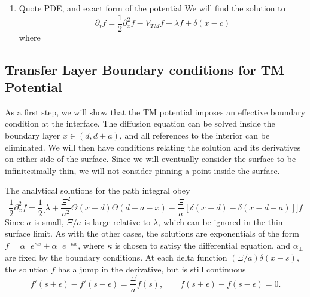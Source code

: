 \begin{enumerate}

  \item Quote PDE, and exact form of the potential
    We will find the solution to 
    \begin{equation}
      \partial_t f = \frac{1}{2}\partial_x^2f -V_{TM} f - \lambda f + \delta(x-c)
    \end{equation}
    where 
\end{enumerate}

\subsection{Transfer Layer Boundary conditions for TM Potential}

As a first step, we will show that the TM potential imposes an effective boundary condition at the interface. 
The diffusion equation can be solved inside the boundary layer $x\in(d,d+a)$, and all references 
to the interior can be eliminated.  We will then have conditions relating the solution and its derivatives
on either side of the surface.  Since we will eventually consider the surface to be infinitesimally thin,
we will not consider pinning a point inside the surface.  

The analytical solutions for the path integral obey
\begin{equation}
  \frac{1}{2}\partial_x^2f =\frac{1}{2}\bigg[\lambda+\frac{\Xi^2}{a^2}\Theta(x-d)\Theta(d+a-x)
  - \frac{\Xi}{a}[\delta(x-d)-\delta(x-d-a)]\bigg]f
\end{equation}
Since $a$ is small, $\Xi/a$ is large relative to $\lambda$, which can be ignored in the thin-surface limit.    
As with the other cases, the solutions are exponentials of the form $f = \alpha_+ e^{\kappa x}+\alpha_- e^{-\kappa x}$, 
where $\kappa$ is chosen to satisy the differential equation, and $\alpha_\pm$ are fixed by the boundary conditions.
At each delta function $(\Xi/a)\delta(x-s)$, the solution $f$ has a jump in the derivative, but is still continuous
\begin{equation}
  f'(s+\epsilon)-f'(s-\epsilon) = \frac{\Xi}{a} f(s),\qquad f(s+\epsilon)-f(s-\epsilon) = 0.
\end{equation}

